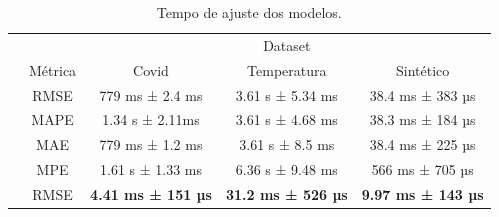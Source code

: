 \begin{table}[!htp]
    \caption{Tempo de ajuste dos modelos.}
    \label{tab:tempo_ajuste}
    \setlength\extrarowheight{5pt}
    \begin{tabular}{|c|c|ccc|}
        \hline
        \rowcolor[HTML]{C0C0C0}
        \cellcolor[HTML]{C0C0C0}                          & \cellcolor[HTML]{C0C0C0}                          & \multicolumn{3}{c|}{\cellcolor[HTML]{C0C0C0}Dataset}                                                                                                                         \\ \cline{3-5}
        \rowcolor[HTML]{C0C0C0}
        \multirow{-2}{*}{\cellcolor[HTML]{C0C0C0}Modelo}  & \multirow{-2}{*}{\cellcolor[HTML]{C0C0C0}Métrica} & \multicolumn{1}{c|}{\cellcolor[HTML]{C0C0C0}Covid}                      & \multicolumn{1}{c|}{\cellcolor[HTML]{C0C0C0}Temperatura}               & Sintético                 \\ \hline
        \cellcolor[HTML]{C0C0C0}                          & RMSE                                              & \multicolumn{1}{c|}{779 ms ± 2.4 ms}                                    & \multicolumn{1}{c|}{3.61 s ± 5.34 ms}                                  & 38.4 ms ± 383 µs          \\ \cline{2-5}
        \rowcolor[HTML]{EFEFEF}
        \cellcolor[HTML]{C0C0C0}                          & MAPE                                              & \multicolumn{1}{c|}{\cellcolor[HTML]{EFEFEF}1.34 s ± 2.11ms}            & \multicolumn{1}{c|}{\cellcolor[HTML]{EFEFEF}3.61 s ± 4.68 ms}          & 38.3 ms ± 184 µs          \\ \cline{2-5}
        \cellcolor[HTML]{C0C0C0}                          & MAE                                               & \multicolumn{1}{c|}{779 ms ± 1.2 ms}                                    & \multicolumn{1}{c|}{3.61 s ± 8.5 ms}                                   & 38.4 ms ± 225 µs          \\ \cline{2-5}
        \rowcolor[HTML]{EFEFEF}
        \multirow{-4}{*}{\cellcolor[HTML]{C0C0C0}ARIMA}   & MPE                                               & \multicolumn{1}{c|}{\cellcolor[HTML]{EFEFEF}1.61 s ± 1.33 ms}           & \multicolumn{1}{c|}{\cellcolor[HTML]{EFEFEF}6.36 s ± 9.48 ms}          & 566 ms ± 705 µs           \\ \hline
        \cellcolor[HTML]{C0C0C0}                          & RMSE                                              & \multicolumn{1}{c|}{\textbf{4.41 ms ± 151 µs}}                          & \multicolumn{1}{c|}{\textbf{31.2 ms ± 526 µs}}                         & \textbf{9.97 ms ± 143 µs} \\ \cline{2-5}

\end{tabular}
\end{table}
